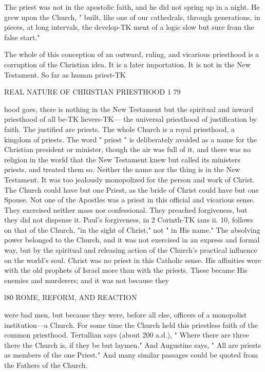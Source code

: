 \documentclass[12pt,a5paper,twoside]{book}
\begin{document}
{The priest was not in the apostolic faith, and he 
did not spring up in a night. He grew upon the 
Church, " built, like one of our cathedrals, through 
generations, in pieces, at long intervals, the develop-TK
ment of a logic slow but sure from the false start." 

The whole of this conception of an outward, 
ruling, and vicarious priesthood is a corruption of 
the Christian idea. It is a later importation. It is 
not in the New Testament. So far as human priest-TK



REAL NATURE OF CHRISTIAN PRIESTHOOD 1 79 

hood goes, there is nothing in the New Testament 
but the spiritual and inward priesthood of all be-TK
lievers-TK— the universal priesthood of justification by 
faith. The justified are priests. The whole Church 
is a royal priesthood, a kingdom of priests. The word 
" priest " is deliberately avoided as a name for the 
Christian president or minister, though the air was 
full of it, and there was no religion in the world that 
the New Testament knew but called its ministers 
priests, and treated them so. Neither the name nor 
the thing is in the New Testament. It was too 
jealously monopolized for the person and work of 
Christ. The Church could have but one Priest, 
as the bride of Christ could have but one Spouse. 
Not one of the Apostles was a priest in this official 
and vicarious sense. They exercised neither mass nor 
confessional. They preached forgiveness, but they 
did not dispense it. Paul's forgiveness, in 2 Corinth-TK
ians ii. 10, follows on that of the Church, "in the 
sight of Christ," not " in His name." The absolving 
power belonged to the Church, and it was not exercised 
in an express and formal way, but by the spiritual and 
releasing action of the Church's practical influence on 
the world's soul. Christ was no priest in this Catholic 
sense. His affinities were with the old prophets of 
Israel more than with the priests. These became His 
enemies and murderers; and it was not because they 



l80 ROME, REFORM, AND REACTION 

were bad men, but because they were, before all else, 
officers of a monopolist institution---a Church. For 
some time the Church held this priestless faith of the 
common priesthood. Tertullian says (about 200 a.d.), 
" Where there are three there the Church is, if they 
be but laymen." And Augustine says, " All are 
priests as members of the one Priest." And many 
similar passages could be quoted from the Fathers of 
the Church. 

}
\end{document}
